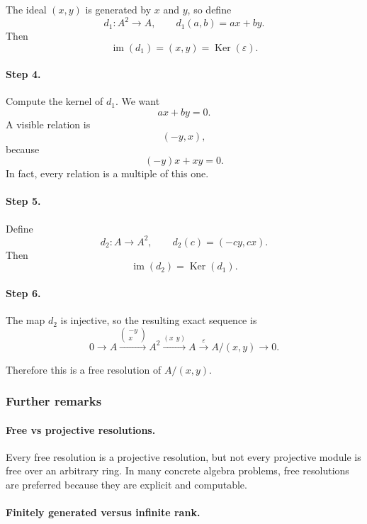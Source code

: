 \documentclass[12pt,a4paper]{article}
\theoremstyle{notespace}
\DeclareMathOperator{\im}{im}
\newcommand{\kerf}{\operatorname{Ker}}
\begin{document}
The ideal \((x,y)\) is generated by \(x\) and \(y\), so define
\[
d_1:A^2\to A,\qquad d_1(a,b)=ax+by.
\]
Then
\[
\im(d_1)=(x,y)=\kerf(\varepsilon).
\]

\paragraph{Step 4.}

Compute the kernel of \(d_1\). We want
\[
ax+by=0.
\]
A visible relation is
\[
(-y,x),
\]
because
\[
(-y)x + xy=0.
\]
In fact, every relation is a multiple of this one.

\paragraph{Step 5.}

Define
\[
d_2:A\to A^2,\qquad d_2(c)=(-cy,cx).
\]
Then
\[
\im(d_2)=\kerf(d_1).
\]

\paragraph{Step 6.}

The map \(d_2\) is injective, so the resulting exact sequence is
\[
0\to A \xrightarrow{\begin{pmatrix}-y\\x\end{pmatrix}} A^2 \xrightarrow{(x\ \ y)} A \xrightarrow{\varepsilon} A/(x,y)\to 0.
\]

Therefore this is a free resolution of \(A/(x,y)\).

\subsubsection{Further remarks}

\paragraph{Free vs projective resolutions.}

Every free resolution is a projective resolution, but not every projective module is free over an arbitrary ring. In many concrete algebra problems, free resolutions are preferred because they are explicit and computable.

\paragraph{Finitely generated versus infinite rank.}
\end{document}

